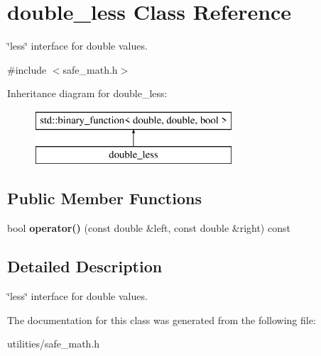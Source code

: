 \hypertarget{classdouble__less}{\section{double\-\_\-less Class Reference}
\label{classdouble__less}
}


\char`\"{}less\char`\"{} interface for double values.  




{\ttfamily \#include $<$safe\-\_\-math.\-h$>$}

Inheritance diagram for double\-\_\-less\-:\begin{figure}[H]
\begin{center}
\leavevmode
\includegraphics[height=2.000000cm]{classdouble__less}
\end{center}
\end{figure}
\subsection*{Public Member Functions}
\begin{DoxyCompactItemize}
\item 
\hypertarget{group___mathematics_ga8ab290c346a3fa091aac241536ce1c95}{bool {\bfseries operator()} (const double \&left, const double \&right) const }\label{group___mathematics_ga8ab290c346a3fa091aac241536ce1c95}

\end{DoxyCompactItemize}


\subsection{Detailed Description}
\char`\"{}less\char`\"{} interface for double values. 

The documentation for this class was generated from the following file\-:\begin{DoxyCompactItemize}
\item 
utilities/safe\-\_\-math.\-h\end{DoxyCompactItemize}
